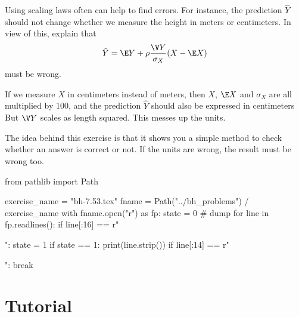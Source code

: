 \begin{exercise}
Using scaling laws often can help to find errors. For instance,  the prediction $\hat Y$ should not change whether we measure the height in meters or centimeters.
In view of this, explain that
\begin{align*}
  \hat Y = \E Y + \rho \frac{\V Y}{\sigma_X} (X - \E X)
\end{align*}
must be wrong.
\begin{solution}
  If we measure $X$ in centimeters instead of meters, then $X$, $\E X$ and $\sigma_X$ are all multiplied by 100, and the prediction $\hat Y$ should also be expressed in centimeters But $\V Y $ scales as length squared.
  This messes up the units.

  The idea behind this exercise is that it shows you a simple method to check whether an answer is correct or not. If the units are wrong, the result must be wrong too.
\end{solution}
\end{exercise}





\begin{pycode}
from pathlib import Path

exercise_name = "bh-7.53.tex"
fname = Path("../bh_problems") / exercise_name
with fname.open("r") as fp:
    state = 0  # dump
    for line in fp.readlines():
        if line[:16] == r"\begin{exercise}":
            state = 1
        if state == 1:
            print(line.strip())
        if line[:14] == r"\end{exercise}":
            break
\end{pycode}


\section{Tutorial}
\label{sec:tutorial}


